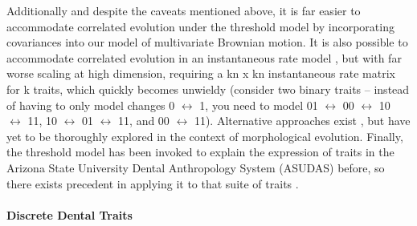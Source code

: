\documentclass[12pt, twocolumn, twoside]{article}
\begin{document}
Additionally and despite the caveats mentioned above, it is far easier to accommodate correlated evolution under the threshold model by incorporating covariances into our model of multivariate Brownian motion. It is also possible to accommodate correlated evolution in an instantaneous rate model \citep{pagelDetectingCorrelatedEvolution1994, pagelBayesianAnalysisCorrelated2006}, but with far worse scaling at high dimension, requiring a kn x kn instantaneous rate matrix for k traits, which quickly becomes unwieldy (consider two binary traits – instead of having to only model changes 0 $\leftrightarrow$ 1, you need to model 01 $\leftrightarrow$ 00 $\leftrightarrow$ 10 $\leftrightarrow$ 11, 10 $\leftrightarrow$ 01 $\leftrightarrow$ 11, and 00 $\leftrightarrow$ 11). Alternative approaches exist \citep{robinsonProteinEvolutionDependence2003, rodrigueSiteInterdependenceAttributed2005, rodrigueAssessingSiteinterdependentPhylogenetic2006}, but have yet to be thoroughly explored in the context of morphological evolution. Finally, the threshold model has been invoked to explain the expression of traits in the Arizona State University Dental Anthropology System (ASUDAS) \citep{turnerScoringProducesKey1991} before, so there exists precedent in applying it to that suite of traits \citep{scottAnthropologyModernHuman2018}.  

\paragraph{Discrete Dental Traits}
\end{document}
